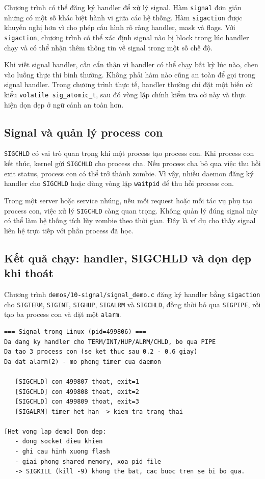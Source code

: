 \documentclass[11pt]{article}
\newcommand{\code}[1]{\texttt{#1}}
\begin{document}
Chương trình có thể đăng ký handler để xử lý signal. Hàm \code{signal} đơn giản nhưng có một số khác biệt hành vi giữa các hệ thống. Hàm \code{sigaction} được khuyến nghị hơn vì cho phép cấu hình rõ ràng handler, mask và flags. Với \code{sigaction}, chương trình có thể xác định signal nào bị block trong lúc handler chạy và có thể nhận thêm thông tin về signal trong một số chế độ.

Khi viết signal handler, cần cẩn thận vì handler có thể chạy bất kỳ lúc nào, chen vào luồng thực thi bình thường. Không phải hàm nào cũng an toàn để gọi trong signal handler. Trong chương trình thực tế, handler thường chỉ đặt một biến cờ kiểu \code{volatile sig\_atomic\_t}, sau đó vòng lặp chính kiểm tra cờ này và thực hiện dọn dẹp ở ngữ cảnh an toàn hơn.

\subsection{Signal và quản lý process con}

\code{SIGCHLD} có vai trò quan trọng khi một process tạo process con. Khi process con kết thúc, kernel gửi \code{SIGCHLD} cho process cha. Nếu process cha bỏ qua việc thu hồi exit status, process con có thể trở thành zombie. Vì vậy, nhiều daemon đăng ký handler cho \code{SIGCHLD} hoặc dùng vòng lặp \code{waitpid} để thu hồi process con.

Trong một server hoặc service nhúng, nếu mỗi request hoặc mỗi tác vụ phụ tạo process con, việc xử lý \code{SIGCHLD} càng quan trọng. Không quản lý đúng signal này có thể làm hệ thống tích lũy zombie theo thời gian. Đây là ví dụ cho thấy signal liên hệ trực tiếp với phần process đã học.

\subsection{Kết quả chạy: handler, SIGCHLD và dọn dẹp khi thoát}

Chương trình \code{demos/10-signal/signal\_demo.c} đăng ký handler bằng \code{sigaction} cho \code{SIGTERM}, \code{SIGINT}, \code{SIGHUP}, \code{SIGALRM} và \code{SIGCHLD}, đồng thời bỏ qua \code{SIGPIPE}, rồi tạo ba process con và đặt một \code{alarm}.

\begin{lstlisting}[caption={Nhận SIGCHLD từ ba process con và SIGALRM từ timer}]
=== Signal trong Linux (pid=499806) ===
Da dang ky handler cho TERM/INT/HUP/ALRM/CHLD, bo qua PIPE
Da tao 3 process con (se ket thuc sau 0.2 - 0.6 giay)
Da dat alarm(2) - mo phong timer cua daemon

   [SIGCHLD] con 499807 thoat, exit=1
   [SIGCHLD] con 499808 thoat, exit=2
   [SIGCHLD] con 499809 thoat, exit=3
   [SIGALRM] timer het han -> kiem tra trang thai

[Het vong lap demo] Don dep:
   - dong socket dieu khien
   - ghi cau hinh xuong flash
   - giai phong shared memory, xoa pid file
   -> SIGKILL (kill -9) khong the bat, cac buoc tren se bi bo qua.
\end{lstlisting}
\end{document}
